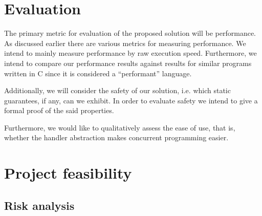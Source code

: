 \documentclass[preprint,10pt,numbers]{sigplanconf}
\begin{document}
    

  \section{Evaluation}
  The primary metric for evaluation of the proposed solution will be performance. As discussed earlier there are various metrics for measuring performance. We intend to mainly measure performance by raw execution speed. Furthermore, we intend to compare our performance results against results for similar programs written in C since it is considered a ``performant'' language. 

Additionally, we will consider the safety of our solution, i.e. which static guarantees, if any, can we exhibit. In order to evaluate safety we intend to give a formal proof of the said properties.

Furthermore, we would like to qualitatively assess the ease of use, that is, whether the handler abstraction makes concurrent programming easier.

  \section{Project feasibility}
  \subsection{Risk analysis}
\end{document}
